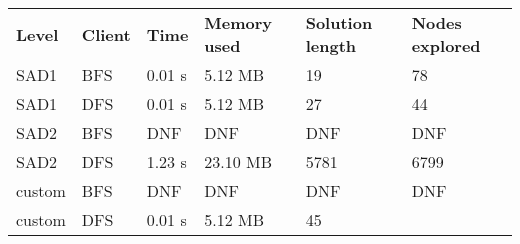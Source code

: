 












\begin{table}[h]
\begin{tabular}{llllll}
\rowcolor[HTML]{EFEFEF} 
\textbf{Level} & \textbf{Client} & \textbf{Time} & \textbf{Memory used} & \textbf{Solution length} & \textbf{Nodes explored} \\
SAD1           & BFS             & 0.01 s        & 5.12 MB              & 19                       & 78                      \\
SAD1           & DFS             & 0.01 s        & 5.12 MB              & 27                       & 44                      \\
SAD2           & BFS             & DNF           & DNF                  & DNF                      & DNF                     \\
SAD2           & DFS             & 1.23 s        & 23.10 MB             & 5781                     & 6799                    \\
custom         & BFS             & DNF           & DNF                  & DNF                      & DNF                     \\
custom         & DFS             & 0.01 s        & 5.12 MB              & 45                       &                        
\end{tabular}
\end{table}